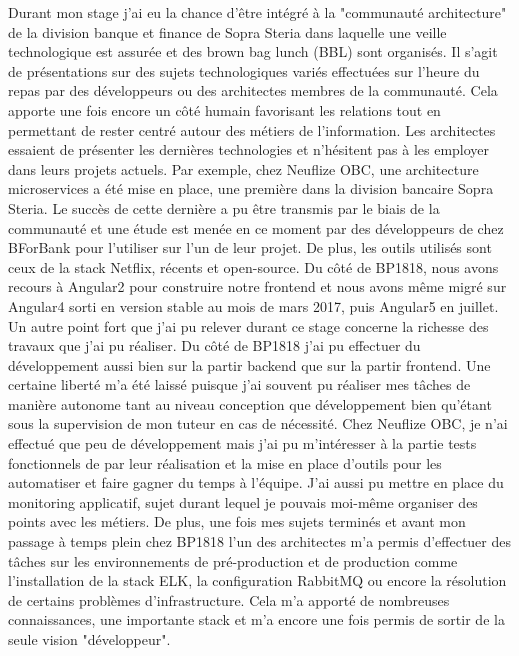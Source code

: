 \begin{changemargin}{-1cm}{-1cm}
	Durant mon stage j'ai eu la chance d'être intégré à la "communauté architecture" de la division banque et finance de Sopra Steria dans laquelle une veille technologique est assurée et des brown bag lunch (BBL) sont organisés. Il s'agit de présentations sur des sujets technologiques variés effectuées sur l'heure du repas par des développeurs ou des architectes membres de la communauté. Cela apporte une fois encore un côté humain favorisant les relations tout en permettant de rester centré autour des métiers de l'information. Les architectes essaient de présenter les dernières technologies et n'hésitent pas à les employer dans leurs projets actuels. Par exemple, chez Neuflize OBC, une architecture microservices a été mise en place, une première dans la division bancaire Sopra Steria. Le succès de cette dernière a pu être transmis par le biais de la communauté et une étude est menée en ce moment par des développeurs de chez BForBank pour l'utiliser sur l'un de leur projet. De plus, les outils utilisés sont ceux de la stack Netflix, récents et open-source. Du côté de BP1818, nous avons recours à Angular2 pour construire notre frontend et nous avons même migré sur Angular4 sorti en version stable au mois de mars 2017, puis Angular5 en juillet. \\
	
	Un autre point fort que j'ai pu relever durant ce stage concerne la richesse des travaux que j'ai pu réaliser. Du côté de BP1818 j'ai pu effectuer du développement aussi bien sur la partir backend que sur la partir frontend. Une certaine liberté m'a été laissé puisque j'ai souvent pu réaliser mes tâches de manière autonome tant au niveau conception que développement bien qu'étant sous la supervision de mon tuteur en cas de nécessité. Chez Neuflize OBC, je n'ai effectué que peu de développement mais j'ai pu m'intéresser à la partie tests fonctionnels de par leur réalisation et la mise en place d'outils pour les automatiser et faire gagner du temps à l'équipe. J'ai aussi pu mettre en place du monitoring applicatif, sujet durant lequel je pouvais moi-même organiser des points avec les métiers. De plus, une fois mes sujets terminés et avant mon passage à temps plein chez BP1818 l'un des architectes m'a permis d'effectuer des tâches sur les environnements de pré-production et de production comme l'installation de la stack ELK, la configuration RabbitMQ ou encore la résolution de certains problèmes d'infrastructure. Cela m'a apporté de nombreuses connaissances, une importante stack et m'a encore une fois permis de sortir de la seule vision "développeur". \\
	

\end{changemargin}
